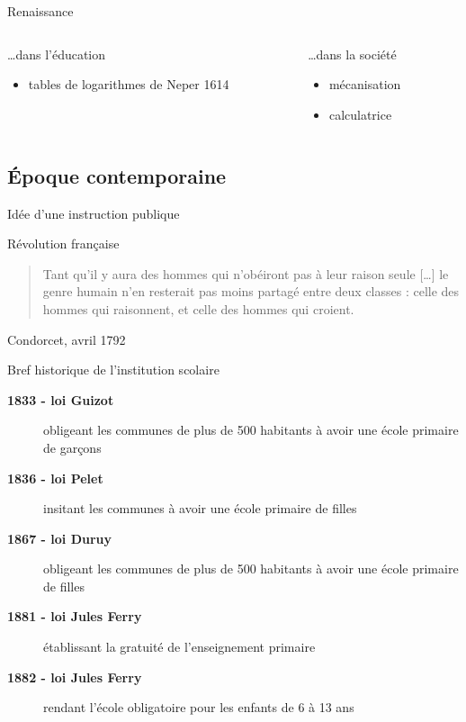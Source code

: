 \begin{frame}{Renaissance}
\begin{columns}
\begin{column}{0.49\linewidth}
\ldots dans l'éducation
\begin{itemize}
\item tables de logarithmes de Neper 1614
\end{itemize}
\end{column}

\begin{column}{0.49\linewidth}
\ldots dans la société
\begin{itemize}
\item mécanisation
\item calculatrice
\end{itemize}
\end{column}
\end{columns}
\end{frame}

\subsection{Époque contemporaine}

\begin{frame}{Idée d'une instruction publique}

Révolution française

\begin{quote}
Tant qu'il y aura des hommes qui n'obéiront pas à leur raison seule [\ldots] le genre humain n'en resterait pas moins partagé entre deux classes : celle des hommes qui raisonnent, et celle 
des hommes qui croient.
\end{quote}
Condorcet, avril 1792

\end{frame}

\begin{frame}{Bref historique de l'institution scolaire}
\begin{description}
\item[\bf 1833 - loi Guizot] obligeant les communes de plus de 500 habitants à avoir une école primaire de garçons
\item[\bf 1836 - loi Pelet] insitant les communes à avoir une école primaire de filles
\item[\bf 1867 - loi Duruy] obligeant les communes de plus de 500 habitants à avoir une école primaire de filles
\item[\bf 1881 - loi Jules Ferry] établissant la gratuité de l'enseignement primaire
\item[\bf 1882 - loi Jules Ferry] rendant l'école obligatoire pour les enfants de 6 à 13 ans
\end{description}

\end{frame}

